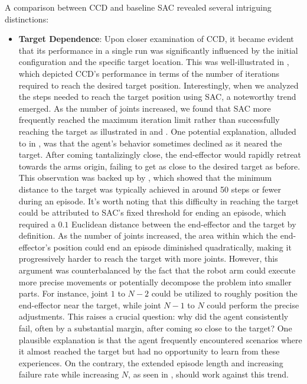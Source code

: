 A comparison between CCD and baseline SAC revealed several intriguing distinctions:

\begin{itemize}
    \item \textbf{Target Dependence}: Upon closer examination of CCD, it became evident that its performance in a single run was significantly influenced by the initial configuration and the specific target location. This was well-illustrated in  , which depicted CCD's performance in terms of the number of iterations required to reach the desired target position. Interestingly, when we analyzed the steps needed to reach the target position using SAC, a noteworthy trend emerged. As the number of joints increased, we found that SAC more frequently reached the maximum iteration limit rather than successfully reaching the target as illustrated in  and . One potential explanation, alluded to in , was that the agent's behavior sometimes declined as it neared the target. After coming tantalizingly close, the end-effector would rapidly retreat towards the arms origin, failing to get as close to the desired target as before. This observation was backed up by , which showed that the minimum distance to the target was typically achieved in around 50 steps or fewer during an episode. It's worth noting that this difficulty in reaching the target could be attributed to SAC's fixed threshold for ending an episode, which required a $0.1$ Euclidean distance between the end-effector and the target by definition. As the number of joints increased, the area within which the end-effector's position could end an episode diminished quadratically, making it progressively harder to reach the target with more joints. However, this argument was counterbalanced by the fact that the robot arm could execute more precise movements or potentially decompose the problem into smaller parts. For instance, joint $1$ to $N-2$ could be utilized to roughly position the end-effector near the target, while joint $N-1$ to $N$ could perform the precise adjustments. This raises a crucial question: why did the agent consistently fail, often by a substantial margin, after coming so close to the target? One plausible explanation is that the agent frequently encountered scenarios where it almost reached the target but had no opportunity to learn from these experiences. On the contrary, the extended episode length and increasing failure rate while increasing $N$, as seen in  , should work against this trend.

\end{itemize}
